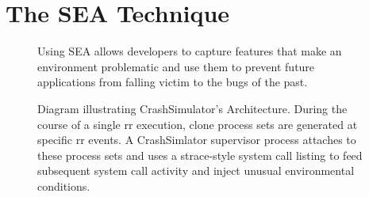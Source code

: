 \section{The SEA Technique}
\label{SEC:approach}

\begin{figure}[t]
  \center{}
  \caption{Using SEA allows developers to capture features that make an
    environment problematic and use them to prevent future applications
    from falling victim to the bugs of the past.}
  \label{figure:approach}
\end{figure}

\begin{figure}[t]
  \center{}
  \caption{Diagram illustrating CrashSimulator's Architecture.  During the
    course of a single rr execution, clone process sets are generated at
    specific rr events.  A CrashSimlator supervisor process attaches to
    these process sets and uses a strace-style system call listing to feed
    subsequent system call activity and inject unusual environmental
    conditions.}
  \label{figure:architecture}
\end{figure}

